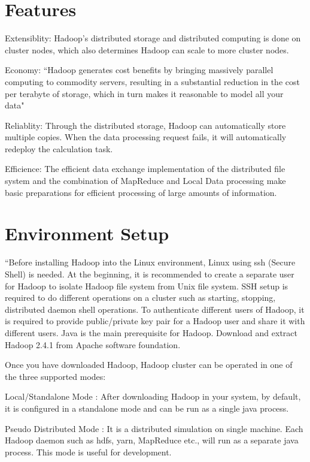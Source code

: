 \section{Features}
Extensiblity: Hadoop's distributed storage and distributed computing is done on 
cluster nodes, which also determines Hadoop can scale to more cluster nodes.

Economy: ``Hadoop generates cost benefits by bringing massively parallel computing 
to commodity servers, resulting in a substantial reduction in the cost per terabyte 
of storage, which in turn makes it reasonable to model all your data"~\cite{hid-sp18-508-features}

Reliablity: Through the distributed storage, Hadoop can automatically store multiple 
copies. When the data processing request fails, it will automatically redeploy the 
calculation task.

Efficience: The efficient data exchange implementation of the distributed file system 
and the combination of MapReduce and Local Data processing make basic preparations 
for efficient processing of large amounts of information.


\section{Environment Setup}
``Before installing Hadoop into the Linux environment,  Linux using ssh (Secure Shell) 
is needed. At the beginning, it is recommended to create a separate user for Hadoop 
to isolate Hadoop file system from Unix file system. SSH setup is required to do 
different operations on a cluster such as starting, stopping, distributed daemon 
shell operations. To authenticate different users of Hadoop, it is required to 
provide public/private key pair for a Hadoop user and share it with different 
users. Java is the main prerequisite for Hadoop. Download and extract Hadoop 2.4.1 
from Apache software foundation. 

Once you have downloaded Hadoop, Hadoop cluster can be operated in one of the 
three supported modes:

Local/Standalone Mode : After downloading Hadoop in your system, by default, 
it is configured in a standalone mode and can be run as a single java process.

Pseudo Distributed Mode : It is a distributed simulation on single machine. 
Each Hadoop daemon such as hdfs, yarn, MapReduce etc., will run as a separate 
java process. This mode is useful for development.


